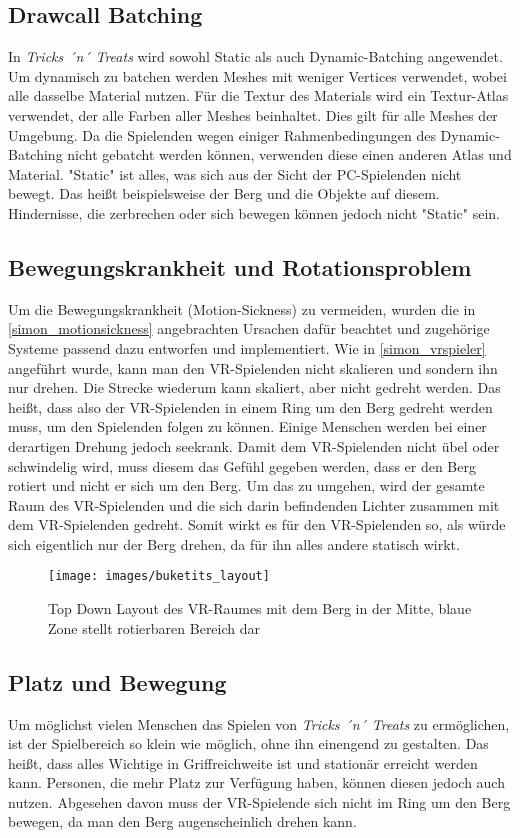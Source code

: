 \subsection{Drawcall Batching}
In \emph{Tricks ´n´ Treats} wird sowohl Static als auch Dynamic-Batching angewendet. Um dynamisch zu batchen werden Meshes mit weniger Vertices verwendet, wobei alle dasselbe Material nutzen. Für die Textur des Materials wird ein Textur-Atlas verwendet, der alle Farben aller Meshes beinhaltet. Dies gilt für alle Meshes der Umgebung. Da die Spielenden wegen einiger Rahmenbedingungen des Dynamic-Batching nicht gebatcht werden können, verwenden diese einen anderen Atlas und Material. "Static" ist alles, was sich aus der Sicht der PC-Spielenden nicht bewegt. Das heißt beispielsweise der Berg und die Objekte auf diesem. Hindernisse, die zerbrechen oder sich bewegen können jedoch nicht "Static" sein.

\subsection{Bewegungskrankheit und Rotationsproblem}
Um die Bewegungskrankheit (Motion-Sickness) zu vermeiden, wurden die in \ref{simon_motionsickness} angebrachten Ursachen dafür beachtet und zugehörige Systeme passend dazu entworfen und implementiert.
Wie in \ref{simon_vrspieler} angeführt wurde, kann man den VR-Spielenden nicht skalieren und sondern ihn nur drehen. Die Strecke wiederum kann skaliert, aber nicht gedreht werden. Das heißt, dass also der VR-Spielenden in einem Ring um den Berg gedreht werden muss, um den Spielenden folgen zu können. Einige Menschen werden bei einer derartigen Drehung jedoch seekrank. Damit dem VR-Spielenden nicht übel oder schwindelig wird, muss diesem das Gefühl gegeben werden, dass er den Berg rotiert und nicht er sich um den Berg. Um das zu umgehen, wird der gesamte Raum des VR-Spielenden und die sich darin befindenden Lichter zusammen mit dem VR-Spielenden gedreht. Somit wirkt es für den VR-Spielenden so, als würde sich eigentlich nur der Berg drehen, da für ihn alles andere statisch wirkt.

\begin{figure}[h]
	\centering
	\texttt{[image: images/buketits\_layout]}
	\caption{Top Down Layout des VR-Raumes mit dem Berg in der Mitte, blaue Zone stellt rotierbaren Bereich dar}
\end{figure}


\subsection{Platz und Bewegung}
Um möglichst vielen Menschen das Spielen von \emph{Tricks ´n´ Treats} zu ermöglichen, ist der Spielbereich so klein wie möglich, ohne ihn einengend zu gestalten. Das heißt, dass alles Wichtige in Griffreichweite ist und stationär erreicht werden kann. Personen, die mehr Platz zur Verfügung haben, können diesen jedoch auch nutzen. Abgesehen davon muss der VR-Spielende sich nicht im Ring um den Berg bewegen, da man den Berg augenscheinlich drehen kann.

